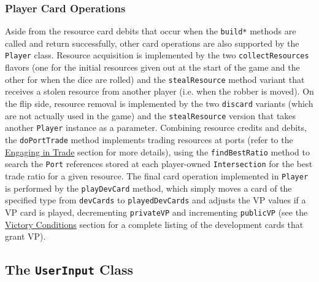 \documentclass[pageno]{jpaper}
\begin{document}
\begin{doublespacing}
\hypertarget{sec:player_card_operations}{}
\subsubsection{Player Card Operations}

Aside from the resource card debits that occur when the \lstinline$build*$ methods are called and return successfully, other card operations are also supported by the \lstinline$Player$ class. Resource acquisition is implemented by the two \lstinline$collectResources$ flavors (one for the initial resources given out at the start of the game and the other for when the dice are rolled) and the \lstinline$stealResource$ method variant that receives a stolen resource from another player (i.e. when the robber is moved). On the flip side, resource removal is implemented by the two \lstinline$discard$ variants (which are not actually used in the game) and the \lstinline$stealResource$ version that takes another \lstinline$Player$ instance as a parameter. Combining resource credits and debits, the \lstinline$doPortTrade$ method implements trading resources at ports (refer to the \hyperlink{sec:engaging_in_trade}{Engaging in Trade} section for more details), using the \lstinline$findBestRatio$ method to search the \lstinline$Port$ references stored at each player-owned \lstinline$Intersection$ for the best trade ratio for a given resource. The final card operation implemented in \lstinline$Player$ is performed by the \lstinline$playDevCard$ method, which simply moves a card of the specified type from \lstinline$devCards$ to \lstinline$playedDevCards$ and adjusts the VP values if a VP card is played, decrementing \lstinline$privateVP$ and incrementing \lstinline$publicVP$ (see the \hyperlink{sec:victory_conditions}{Victory Conditions} section for a complete listing of the development cards that grant VP).

\hypertarget{sec:the_userinput_class}{}
\subsection{The \lstinline$UserInput$ Class}


\end{doublespacing}
\end{document}
